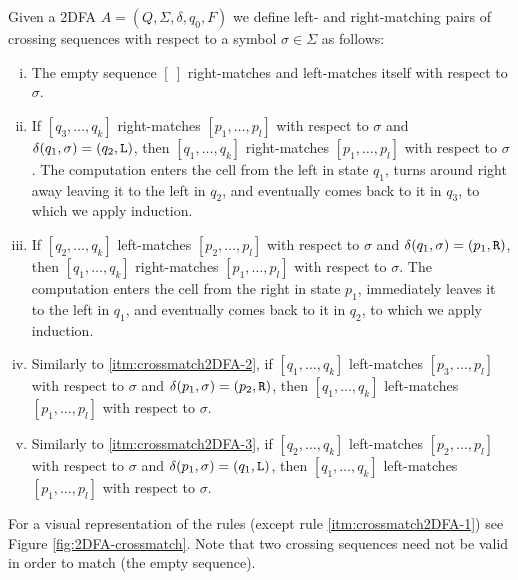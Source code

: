 \begin{defn}
	Given a 2DFA $A=(Q,\Sigma,\delta,q_0,F)$ we define left- and right-matching pairs of crossing sequences with respect to a symbol $\sigma\in\Sigma$ as follows:
	\begin{enumerate}[i.]
		\item \label{itm:crossmatch2DFA-1} The empty sequence $[~]$ right-matches and left-matches itself with respect to $\sigma$.
		\item \label{itm:crossmatch2DFA-2} If $[q_3,\dots,q_k]$ right-matches $[p_1,\dots,p_l]$ with respect to $\sigma$ and $\delta(q_1,\sigma)=(q_2,\mathtt L)$, then $[q_1,\dots,q_k]$ right-matches $[p_1,\dots,p_l]$ with respect to $\sigma$.
		      The computation enters the cell from the left in state $q_1$, turns around right away leaving it to the left in $q_2$, and eventually comes back to it in $q_3$, to which we apply induction.
		\item \label{itm:crossmatch2DFA-3} If $[q_2,\dots,q_k]$ left-matches $[p_2,\dots,p_l]$ with respect to $\sigma$ and $\delta(q_1,\sigma)=(p_1,\mathtt R)$, then $[q_1,\dots,q_k]$ right-matches $[p_1,\dots,p_l]$ with respect to $\sigma$.
		      The computation enters the cell from the right in state $p_1$, immediately leaves it to the left in $q_1$, and eventually comes back to it in $q_2$, to which we apply induction.
		\item \label{itm:crossmatch2DFA-4} Similarly to \ref{itm:crossmatch2DFA-2}, if $[q_1,\dots,q_k]$ left-matches $[p_3,\dots,p_l]$ with respect to $\sigma$ and $\delta(p_1,\sigma)=(p_2,\mathtt R)$, then $[q_1,\dots,q_k]$ left-matches $[p_1,\dots,p_l]$ with respect to $\sigma$.
		\item \label{itm:crossmatch2DFA-5} Similarly to \ref{itm:crossmatch2DFA-3}, if $[q_2,\dots,q_k]$ left-matches $[p_2,\dots,p_l]$ with respect to $\sigma$ and $\delta(p_1,\sigma)=(q_1,\mathtt L)$, then $[q_1,\dots,q_k]$ left-matches $[p_1,\dots,p_l]$ with respect to $\sigma$.
	\end{enumerate}
\end{defn}
For a visual representation of the rules (except rule \ref{itm:crossmatch2DFA-1}) see Figure \ref{fig:2DFA-crossmatch}.
Note that two crossing sequences need not be valid in order to match (\eg the empty sequence).

